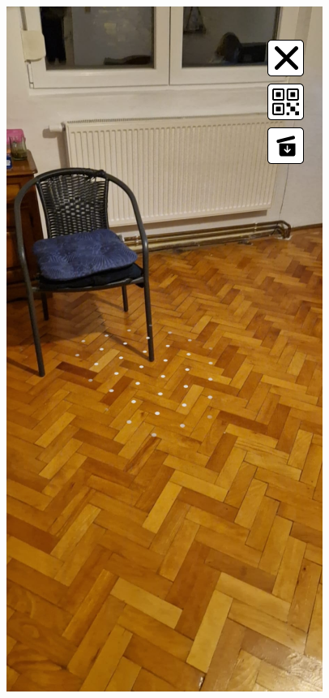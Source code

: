 \begin{center}
    \includegraphics[scale=0.5]{img/App_mock/iPhone 14 - 9.png}
\end{center}
\pagebreak

